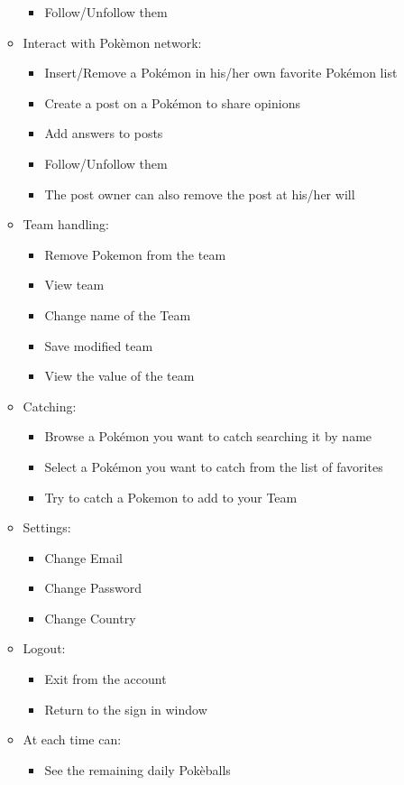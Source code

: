 \begin{itemize}
\begin{itemize}
\begin{itemize}
			\item Follow/Unfollow them
		\end{itemize}
		\item Interact with Pokèmon network:
		\begin{itemize}
			\item Insert/Remove a Pokémon in his/her own favorite Pokémon list
			\item Create a post on a Pokémon to share opinions
			\item Add answers to posts
			\item Follow/Unfollow them
			\item The post owner can also remove the post at his/her will
		\end{itemize}
		\item Team handling:
		\begin{itemize}
			\item Remove Pokemon from the team
			\item View team
			\item Change name of the Team	
			\item Save modified team
			\item View the value of the team
		\end{itemize}
		\item Catching:
		\begin{itemize}
			\item Browse a Pokémon you want to catch searching it by name 
			\item Select a Pokémon you want to catch from the list of favorites
			\item Try to catch a Pokemon to add to your Team
		\end{itemize}
		\item Settings:
		\begin{itemize}
			\item Change Email
			\item Change Password
			\item Change Country
		\end{itemize}
		\item Logout:
		\begin{itemize}
			\item Exit from the account
			\item Return to the sign in window
		\end{itemize}
		\item At each time can:
		\begin{itemize}
			\item See the remaining daily Pokèballs

\end{itemize}
\end{itemize}
\end{itemize}
